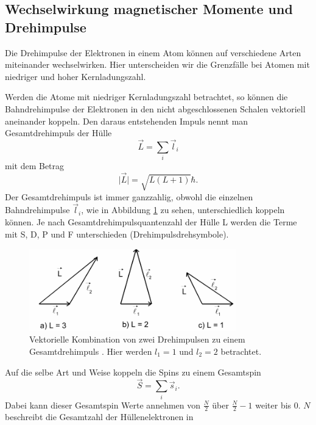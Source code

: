 \subsection{Wechselwirkung magnetischer Momente und Drehimpulse}
\label{sec:Wechselwirkungen}
Die Drehimpulse der Elektronen in einem Atom können auf verschiedene Arten
miteinander wechselwirken. Hier unterscheiden wir die Grenzfälle bei Atomen mit
niedriger und hoher Kernladungszahl.

Werden die Atome mit niedriger Kernladungszahl betrachtet, so können die Bahndrehimpulse
der Elektronen in den nicht abgeschlossenen Schalen vektoriell aneinander koppeln.
Den daraus entstehenden Impuls nennt man Gesamtdrehimpuls der Hülle
\begin{equation}
  \vec{L} = \sum_i \vec{l}_i
  \label{eqn:gesamtbahndrehimpuls}
\end{equation}
mit dem Betrag
\begin{equation}
  \mid\vec{L}\mid = \sqrt{L\left(L+1 \right)} \hbar.
  \label{eqn:betraggesamtdrehipuls}
\end{equation}
Der Gesamtdrehimpuls ist immer ganzzahlig, obwohl die einzelnen Bahndrehimpulse $\vec{l}_i$,
wie in Abbildung \ref{abb:drehimpulse} zu sehen, unterschiedlich koppeln können.
Je nach Gesamtdrehimpulsquantenzahl der Hülle L werden die Terme mit S, D, P und F
unterschieden (Drehimpulsdrehsymbole).
\begin{figure}[htb]
  \centering
  \includegraphics[width=0.8\textwidth]{images/V27.pdf}
  \caption{Vektorielle Kombination von zwei Drehimpulsen zu einem Gesamtdrehimpuls
  \cite{anleitung}. Hier werden $l_1 = 1$ und $l_2 = 2$ betrachtet.}
  \label{abb:drehimpulse}
\end{figure}
Auf die selbe Art und Weise koppeln die Spins zu einem Gesamtspin
\begin{equation}
  \vec{S} = \sum_i \vec{s}_i.
  \label{eqn:gesamtspin}
\end{equation}
Dabei kann dieser Gesamtspin Werte annehmen von $\frac{N}{2}$ über $\frac{N}{2}-1$
weiter bis $\num{0}$. $N$ beschreibt  die Gesamtzahl der Hüllenelektronen in
